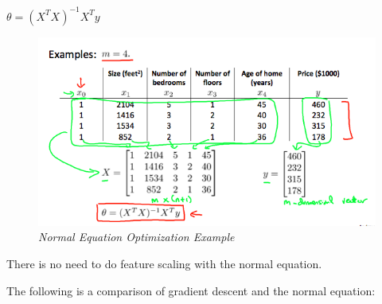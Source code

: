 \documentclass[
]{book}
\begin{document}
\(\theta = (X^T X)^{-1}X^T y\)

\begin{figure}
\centering
\includegraphics{Normal Equation graph 1.png}
\caption{\emph{Normal Equation Optimization Example}}
\end{figure}

There is no need to do feature scaling with the normal equation.

The following is a comparison of gradient descent and the normal equation:
\end{document}
